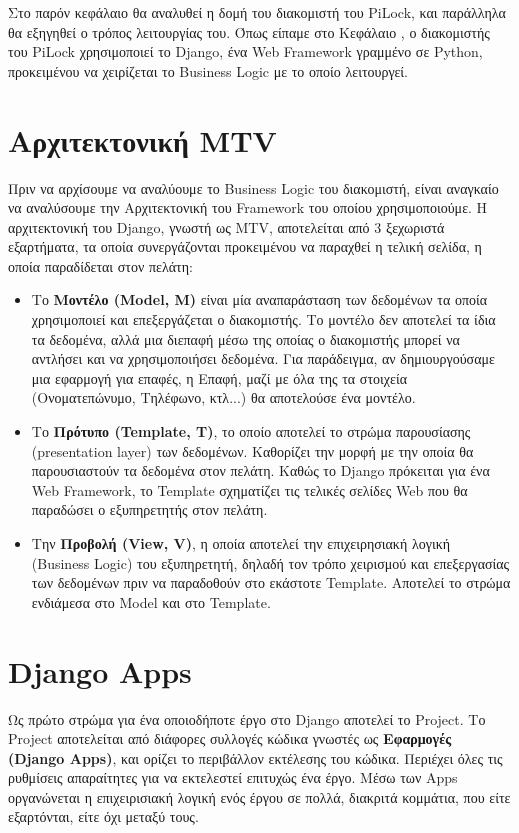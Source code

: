 \label{ch:server}
Στο παρόν κεφάλαιο θα αναλυθεί η δομή του διακομιστή του PiLock, και παράλληλα θα εξηγηθεί ο τρόπος λειτουργίας του. Όπως είπαμε στο Κεφάλαιο , ο διακομιστής του PiLock χρησιμοποιεί το Django, ένα Web Framework γραμμένο σε Python, προκειμένου να χειρίζεται το Business Logic με το οποίο λειτουργεί.

\section{Αρχιτεκτονική MTV}
	\label{sec:mtv_arch}
	Πριν να αρχίσουμε να αναλύουμε το Business Logic του διακομιστή, είναι αναγκαίο να αναλύσουμε την Αρχιτεκτονική του Framework του οποίου χρησιμοποιούμε. Η αρχιτεκτονική του Django, γνωστή ως MTV, αποτελείται από 3 ξεχωριστά εξαρτήματα, τα οποία συνεργάζονται προκειμένου να παραχθεί η τελική σελίδα, η οποία παραδίδεται στον πελάτη:

	\begin{itemize}
		\item Το \textbf{Μοντέλο (Model, M)} είναι μία αναπαράσταση των δεδομένων τα οποία χρησιμοποιεί και επεξεργάζεται ο διακομιστής. Το μοντέλο δεν αποτελεί τα ίδια τα δεδομένα, αλλά μια διεπαφή μέσω της οποίας ο διακομιστής μπορεί να αντλήσει και να χρησιμοποιήσει δεδομένα. Για παράδειγμα, αν δημιουργούσαμε μια εφαρμογή για επαφές, η Επαφή, μαζί με όλα της τα στοιχεία (Ονοματεπώνυμο, Τηλέφωνο, κτλ...) θα αποτελούσε ένα μοντέλο. 
		\item Το \textbf{Πρότυπο (Template, T)}, το οποίο αποτελεί το στρώμα παρουσίασης (presentation layer) των δεδομένων. Καθορίζει την μορφή με την οποία θα παρουσιαστούν τα δεδομένα στον πελάτη. Καθώς το Django πρόκειται για ένα Web Framework, το Template σχηματίζει τις τελικές σελίδες Web που θα παραδώσει ο εξυπηρετητής στον πελάτη.
		\item Την \textbf{Προβολή (View, V)}, η οποία αποτελεί την επιχειρησιακή λογική (Business Logic) του εξυπηρετητή, δηλαδή τον τρόπο χειρισμού και επεξεργασίας των δεδομένων πριν να παραδοθούν στο εκάστοτε Template. Αποτελεί το στρώμα ενδιάμεσα στο Model και στο Template.
	\end{itemize}

\section{Django Apps}
	Ως πρώτο στρώμα για ένα οποιοδήποτε έργο στο Django αποτελεί το Project. Το Project αποτελείται από διάφορες συλλογές κώδικα γνωστές ως \textbf{Εφαρμογές (Django Apps)}, και ορίζει το περιβάλλον εκτέλεσης του κώδικα. Περιέχει όλες τις ρυθμίσεις απαραίτητες για να εκτελεστεί επιτυχώς ένα έργο. Μέσω των Apps οργανώνεται η επιχειρισιακή λογική ενός έργου σε πολλά, διακριτά κομμάτια, που είτε εξαρτόνται, είτε όχι μεταξύ τους.

